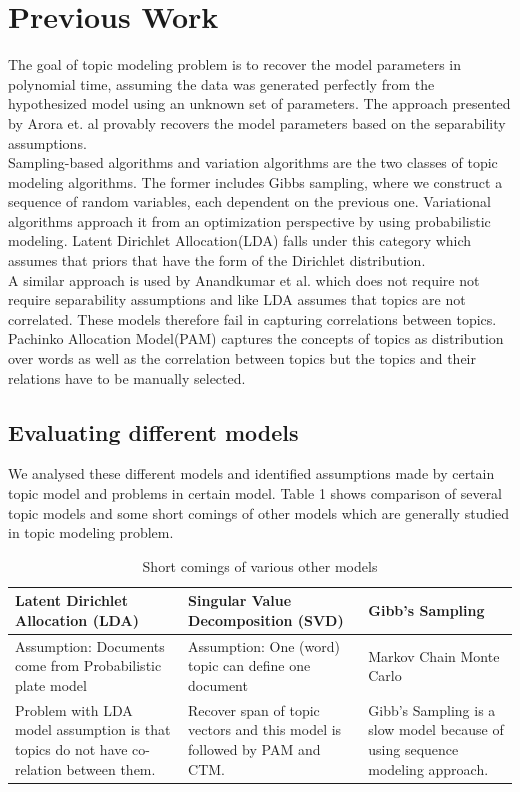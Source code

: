 \documentclass[a4paper,11pt]{article}
\begin{document}
\section{Previous Work}

The goal of topic modeling problem is to recover the model parameters in polynomial time, assuming the data was generated perfectly from the hypothesized model using an unknown set of parameters. The approach presented by Arora et. al \cite{tm} provably recovers the model parameters based on the separability assumptions. \\

Sampling-based algorithms and variation algorithms are the two classes of topic modeling algorithms. The former includes Gibbs sampling, where we construct a sequence of random variables, each dependent on the previous one. Variational algorithms approach it from an optimization perspective by using probabilistic modeling\cite{blei}. Latent Dirichlet Allocation(LDA) falls under this category which assumes that priors that have the form of the Dirichlet distribution.\\ 

A similar approach is used by Anandkumar et al\cite{anand12}. which does not require not require separability assumptions and like LDA assumes that topics are not correlated. These models therefore fail in capturing correlations between topics. Pachinko Allocation Model(PAM) captures the concepts of topics as distribution over words as well as the correlation between topics but the topics and their relations have to be manually selected\cite{pam}.

\subsection{Evaluating different models}
We analysed these different models and identified assumptions made by certain topic model and problems in certain model. Table 1 shows comparison of several topic models and some short comings of other models which are generally studied in topic modeling problem.


\begin{table}
    \begin{tabular}{ | p{6cm} | p{5.5cm} | p{4cm}  |}
    \hline
    Latent Dirichlet Allocation (LDA) & Singular Value Decomposition (SVD) & Gibb's Sampling  \\ \hline \hline
   Assumption:  Documents come from Probabilistic plate model & Assumption: One (word) topic can define one document & Markov Chain Monte Carlo  \\ \hline 
    Problem with LDA model assumption is that topics do not have co-relation between them. & Recover span of topic vectors and this model is followed by PAM and CTM. & Gibb's Sampling is a slow model because of using sequence modeling approach. \\ \hline
    \end{tabular}
    \caption {Short comings of various other models}
    \label{table:comparison}
\end{table}
\end{document}
